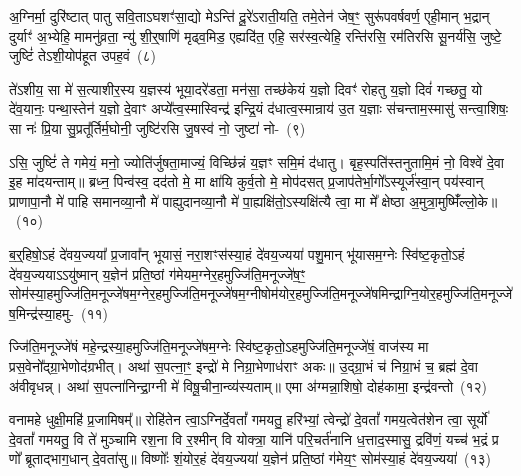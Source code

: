 {\anuvakamend[{रिष्या᳚थ्सपत्न॒क्षय॑ण्यन्ना॒दो भू॑यास॒ꣳ॒ षट्त्रिꣳ॑शच्च}]}%

अ॒ग्निर्मा॒ दुरि॑ष्टात् पातु सवि॒ता\-ऽघशꣳ॑सा॒द्यो मे\-ऽन्ति॑ दू॒रे॑\-ऽराती॒यति॒ तमे॒तेन॑ जेष॒ꣳ॒ सुरू॑पवर्\mbox{}षवर्ण॒ एही॒मान् भ॒द्रान् दुर्याꣳ॑ अ॒भ्येहि॒ मामनु॑व्रता॒ न्यु॑ शी॒र्॒\mbox{}षाणि॑ मृढ्व॒मिड॒ एह्यदि॑त॒ एहि॒ सर॑स्व॒त्येहि॒ रन्ति॑रसि॒ रम॑तिरसि सू॒नर्य॑सि॒ जुष्टे॒ जुष्टिं॑ ते\-ऽशी॒योप॑हूत उपह॒वं~(८)

ते॑\-ऽशीय॒ सा मे॑ स॒त्याशीर॒स्य य॒ज्ञस्य॑ भूया॒दरे॑डता॒ मन॑सा॒ तच्छ॑केयं य॒ज्ञो दिवꣳ॑ रोहतु य॒ज्ञो दिवं॑ गच्छतु॒ यो दे॑व॒यानः॒ पन्था॒स्तेन॑ य॒ज्ञो दे॒वाꣳ अप्ये᳚त्व॒स्मास्विन्द्र॑ इन्द्रि॒यं द॑धात्व॒स्मान्राय॑ उ॒त य॒ज्ञाः स॑चन्ताम॒स्मासु॑ सन्त्वा॒शिषः॒ सा नः॑ प्रि॒या सु॒प्रतू᳚र्तिर्म॒घोनी॒ जुष्टि॑रसि जु॒षस्व॑ नो॒ जुष्टा॑ नो-~(९)

ऽसि॒ जुष्टिं॑ ते गमेयं॒ मनो॒ ज्योति॑र्जुषता॒माज्यं॒ विच्छि॑न्नं य॒ज्ञꣳ समि॒मं द॑धातु। बृह॒स्पति॑स्तनुतामि॒मं नो॒ विश्वे॑ दे॒वा इ॒ह मा॑दयन्ताम्॥ ब्रध्न॒ पिन्व॑स्व॒ दद॑तो मे॒ मा क्षा॑यि कुर्व॒तो मे॒ मोप॑दसत् प्र॒जाप॑तेर्भा॒गो᳚\-ऽस्यूर्ज॑स्वा॒न् पय॑स्वान् प्राणापा॒नौ मे॑ पाहि समानव्या॒नौ मे॑ पाह्युदानव्या॒नौ मे॑ पा॒ह्यक्षि॑तो॒\-ऽस्यक्षि॑त्यै त्वा॒ मा मे᳚ क्षेष्ठा अ॒मुत्रा॒मुष्मिँ॑ल्लो॒के॥~(१०)

{\anuvakamend[{उ॒प॒ह॒वं जुष्टा॑ नस्त्वा॒ षट् च॑}]}%

ब॒र्॒\mbox{}हिषो॒\-ऽहं दे॑वय॒ज्यया᳚ प्र॒जावा᳚न् भूयासं॒ नरा॒शꣳस॑स्या॒हं दे॑वय॒ज्यया॑ पशु॒मान् भू॑यासम॒ग्नेः स्वि॑ष्ट॒कृतो॒\-ऽहं दे॑वय॒ज्यया\-ऽ\-ऽयु॑ष्मान् य॒ज्ञेन॑ प्रति॒ष्ठां ग॑मेयम॒ग्ने\-र॒हमुज्जि॑ति॒\-मनूज्जे॑ष॒ꣳ॒ सोम॑\-स्या॒\-हमुज्जि॑ति॒\-मनूज्जे॑षम॒ग्नेर॒हमुज्जि॑ति॒\-मनूज्जे॑षम॒ग्नी\-षोम॑यो\-र॒ह\-मु\-ज्जि॑ति॒\-मनूज्जे॑ष\-मिन्द्राग्नि॒यो\-र॒हमुज्जि॑ति॒\-मनूज्जे॑ष॒\-मिन्द्र॑स्या॒हमु-~(११)

ज्जि॑ति॒मनूज्जे॑षं महे॒न्द्रस्या॒हमुज्जि॑ति॒\-मनूज्जे॑षम॒ग्नेः स्वि॑ष्ट॒कृतो॒\-ऽहमुज्जि॑ति॒मनूज्जे॑षं॒ वाज॑स्य मा प्रस॒वेनो᳚द्ग्रा॒भेणोद॑\-ग्रभीत्। अथा॑ स॒पत्ना॒ꣳ॒ इन्द्रो॑ मे निग्रा॒भेणाध॑राꣳ अकः॥ उ॒द्ग्रा॒भं च॑ निग्रा॒भं च॒ ब्रह्म॑ दे॒वा अ॑वीवृधन्न्। अथा॑ स॒पत्ना॑निन्द्रा॒ग्नी मे॑ विषू॒चीना॒न्व्य॑स्यताम्॥ एमा अ॑ग्मन्ना॒शिषो॒ दोह॑कामा॒ इन्द्र॑वन्तो~(१२)

वनामहे धुक्षी॒महि॑ प्र॒जामिषम्᳚॥ रोहि॑तेन त्वा॒\-ऽग्निर्दे॒वतां᳚ गमयतु॒ हरि॑भ्यां॒ त्वेन्द्रो॑ दे॒वतां᳚ गमय॒त्वेत॑शेन त्वा॒ सूर्यो॑ दे॒वतां᳚ गमयतु॒ वि ते॑ मुञ्चामि रश॒ना वि र॒श्मीन् वि योक्त्रा॒ यानि॑ परि॒चर्त॑नानि ध॒त्ताद॒स्मासु॒ द्रवि॑णं॒ यच्च॑ भ॒द्रं प्र णो᳚ ब्रूताद्भाग॒धान् दे॒वता॑सु॥ विष्णोः᳚ शं॒योर॒हं दे॑वय॒ज्यया॑ य॒ज्ञेन॑ प्रति॒ष्ठां ग॑मेय॒ꣳ॒ सोम॑स्या॒हं दे॑वय॒ज्यया॑~(१३)

